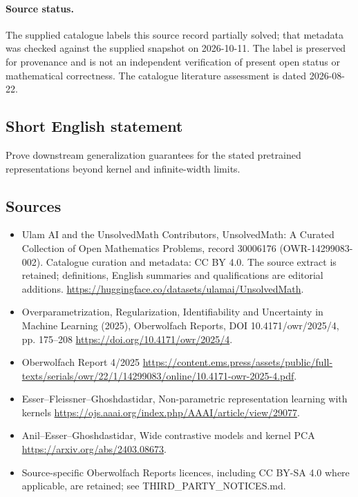 \documentclass[11pt]{article}
\begin{document}
\paragraph{Source status.}
The supplied catalogue labels this source record partially solved; that metadata was checked against the supplied snapshot on 2026-10-11. The label is preserved for provenance and is not an independent verification of present open status or mathematical correctness. The catalogue literature assessment is dated 2026-08-22.
\subsection{Short English statement}
Prove downstream generalization guarantees for the stated pretrained representations beyond kernel and infinite-width limits.
\subsection{Sources}
\begin{itemize}
\item[S1] Ulam AI and the UnsolvedMath Contributors, UnsolvedMath: A Curated Collection of Open Mathematics Problems, record 30006176 (OWR-14299083-002). Catalogue curation and metadata: CC BY 4.0. The source extract is retained; definitions, English summaries and qualifications are editorial additions.
\url{https://huggingface.co/datasets/ulamai/UnsolvedMath}.
\item[S2] Overparametrization, Regularization, Identifiability and Uncertainty in Machine Learning (2025), Oberwolfach Reports, DOI 10.4171/owr/2025/4, pp. 175--208
\url{https://doi.org/10.4171/owr/2025/4}.
\item[S3] Oberwolfach Report 4/2025
\url{https://content.ems.press/assets/public/full-texts/serials/owr/22/1/14299083/online/10.4171-owr-2025-4.pdf}.
\item[S4] Esser--Fleissner--Ghoshdastidar, Non-parametric representation learning with kernels
\url{https://ojs.aaai.org/index.php/AAAI/article/view/29077}.
\item[S5] Anil--Esser--Ghoshdastidar, Wide contrastive models and kernel PCA
\url{https://arxiv.org/abs/2403.08673}.
\item Source-specific Oberwolfach Reports licences, including CC BY-SA 4.0 where applicable, are retained; see THIRD\_PARTY\_NOTICES.md.
\end{itemize}
\end{document}
